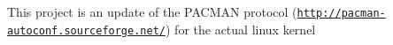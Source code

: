 This project is an update of the P\+A\+C\+M\+A\+N protocol (\href{http://pacman-autoconf.sourceforge.net/}{\tt http\+://pacman-\/autoconf.\+sourceforge.\+net/}) for the actual linux kernel 